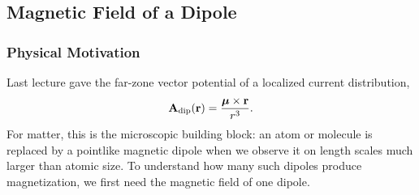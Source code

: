 \subsection{Magnetic Field of a Dipole}\label{subsec:lec16-dipole-field}

\subsubsection*{Physical Motivation}
Last lecture gave the far-zone vector potential of a localized current distribution,
\begin{equation}\label{eq:lec16-Adip-start}
  \mathbf{A}_{\rm dip}(\mathbf{r})=\frac{\boldsymbol{\mu}\times\mathbf{r}}{r^3}.
\end{equation}
For matter, this is the microscopic building block: an atom or molecule is replaced
by a pointlike magnetic dipole when we observe it on length scales much larger than
atomic size.  To understand how many such dipoles produce magnetization, we first need
the magnetic field of one dipole.

